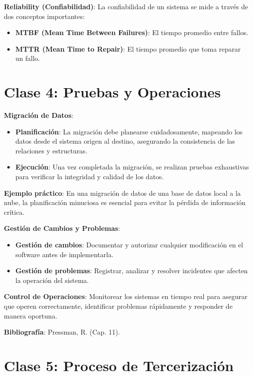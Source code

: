 \documentclass[a4paper,11pt]{article}
\begin{document}
\textbf{Reliability (Confiabilidad)}: La confiabilidad de un sistema se mide a través de dos conceptos importantes:
\begin{itemize}
    \item \textbf{MTBF (Mean Time Between Failures)}: El tiempo promedio entre fallos.
    \item \textbf{MTTR (Mean Time to Repair)}: El tiempo promedio que toma reparar un fallo.
\end{itemize}

\newpage

\section*{Clase 4: Pruebas y Operaciones}

\textbf{Migración de Datos}:
\begin{itemize}
    \item \textbf{Planificación}: La migración debe planearse cuidadosamente, mapeando los datos desde el sistema origen al destino, asegurando la consistencia de las relaciones y estructuras.
    \item \textbf{Ejecución}: Una vez completada la migración, se realizan pruebas exhaustivas para verificar la integridad y calidad de los datos.
\end{itemize}

\textbf{Ejemplo práctico}: En una migración de datos de una base de datos local a la nube, la planificación minuciosa es esencial para evitar la pérdida de información crítica.

\textbf{Gestión de Cambios y Problemas}:
\begin{itemize}
    \item \textbf{Gestión de cambios}: Documentar y autorizar cualquier modificación en el software antes de implementarla.
    \item \textbf{Gestión de problemas}: Registrar, analizar y resolver incidentes que afecten la operación del sistema.
\end{itemize}

\textbf{Control de Operaciones}: Monitorear los sistemas en tiempo real para asegurar que operen correctamente, identificar problemas rápidamente y responder de manera oportuna.

\textbf{Bibliografía}: Pressman, R. (Cap. 11).

\newpage

\section*{Clase 5: Proceso de Tercerización}
\end{document}
